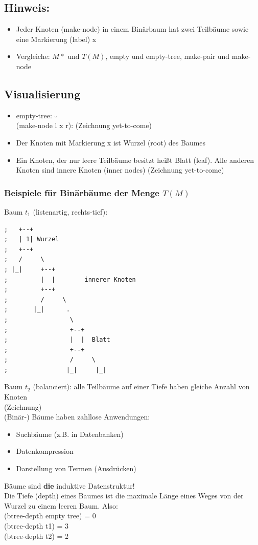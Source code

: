 \documentclass[a4paper, 20pt, openany]{book}
\begin{document}
\subsection{Hinweis:}
\begin{itemize}
\item Jeder Knoten (make-node) in einem Binärbaum hat zwei Teilbäume sowie eine Markierung (label) x
\item Vergleiche: $M*$ und $T(M)$, empty und empty-tree, make-pair und make-node
\end{itemize}
\subsection{Visualisierung}
\begin{itemize} 
\item empty-tree: $\square$\\
 (make-node l x r): (Zeichnung yet-to-come)
\item Der Knoten mit Markierung x ist Wurzel (root) des Baumes
\item Ein Knoten, der nur leere Teilbäume besitzt heißt Blatt (leaf). Alle anderen Knoten sind innere Knoten (inner nodes) (Zeichnung yet-to-come)
\end{itemize}


\subsubsection{Beispiele für Binärbäume der Menge $T(M)$}
Baum $t_1$ (listenartig, rechts-tief):
\begin{lstlisting}
;   +--+                          
;   | 1| Wurzel                       
;   +--+                            
;   /     \                         
; |_|     +--+                        
;         |  |        innerer Knoten       
;         +--+                  
;         /     \                              
;       |_|      .                           
;                 \                             
;                 +--+                 
;                 |  |  Blatt               
;                 +--+                       
;                 /     \          
;                |_|     |_| 
\end{lstlisting}

Baum $t_2$ (balanciert): alle Teilbäume auf einer Tiefe haben gleiche Anzahl von Knoten\\
(Zeichnung)\\

(Binär-) Bäume haben zahllose Anwendungen:
\begin{itemize}
\item Suchbäume (z.B. in Datenbanken)
\item Datenkompression
\item Darstellung von Termen (Ausdrücken)
\end{itemize}
Bäume sind \textbf{die} induktive Datenstruktur!\\
Die Tiefe (depth) eines Baumes ist die maximale Länge eines Weges von der Wurzel zu einem leeren Baum. Also:\\
(btree-depth empty tree) = 0\\
(btree-depth t1) = 3\\
(btree-depth t2) = 2
\end{document}
